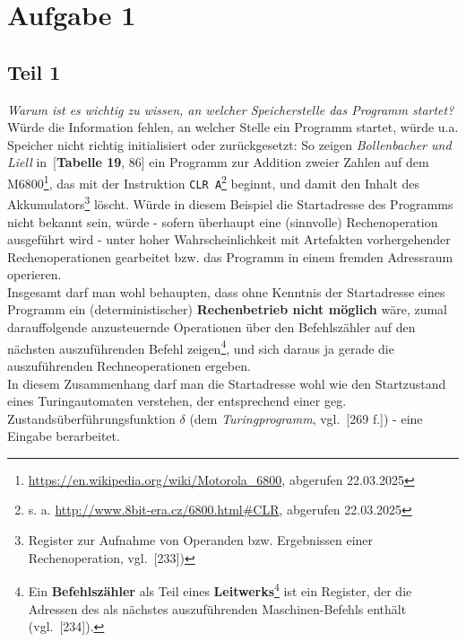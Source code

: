 \chapter{Aufgabe 1}

\section{Teil 1}

\textit{Warum ist es wichtig zu wissen, an welcher Speicherstelle das Programm startet?}\\

\noindent
Würde die Information fehlen, an welcher Stelle ein Programm startet,  würde u.a. Speicher nicht richtig initialisiert oder zurückgesetzt: So zeigen \textit{Bollenbacher und Liell} in~\cite{BL22}[\textbf{Tabelle 19}, 86] ein Programm zur Addition zweier Zahlen auf dem M6800\footnote{
\url{https://en.wikipedia.org/wiki/Motorola_6800}, abgerufen 22.03.2025
}, das mit der Instruktion \texttt{CLR A}\footnote{
s. a. \url{http://www.8bit-era.cz/6800.html#CLR}, abgerufen 22.03.2025
} beginnt, und damit den Inhalt des  Akkumulators\footnote{
Register zur Aufnahme von Operanden bzw. Ergebnissen einer Rechenoperation, vgl.~\cite{Fri21}[233])
} löscht.
Würde in diesem Beispiel die Startadresse des Programms nicht bekannt sein, würde - sofern überhaupt eine (sinnvolle) Rechenoperation ausgeführt wird - unter hoher Wahrscheinlichkeit mit Artefakten vorhergehender Rechenoperationen gearbeitet bzw. das Programm in einem fremden Adressraum operieren.\\

\noindent
Insgesamt darf man wohl behaupten, dass ohne Kenntnis der Startadresse eines Programm ein (deterministischer) \textbf{Rechenbetrieb nicht möglich} wäre, zumal darauffolgende anzusteuernde Operationen über den Befehlszähler auf den nächsten auszuführenden Befehl zeigen\footnote{
Ein \textbf{Befehlszähler} als Teil eines \textbf{Leitwerks}\footnote{
    hier insb. bei der Von-Neumann-Rechnerarchitektur
} ist ein Register, der die Adressen des als nächstes auszuführenden Maschinen-Befehls enthält (vgl.~\cite{Fri21}[234]).
}, und sich daraus ja gerade die auszuführenden Rechneoperationen ergeben.\\

\noindent
In diesem Zusammenhang darf man die Startadresse wohl wie den Startzustand eines Turingautomaten verstehen, der entsprechend einer geg. Zustandsüberführungsfunktion $\delta$ (dem \textit{Turingprogramm}, vgl.~\cite{VW16h}[269 f.]) - eine Eingabe berarbeitet.

